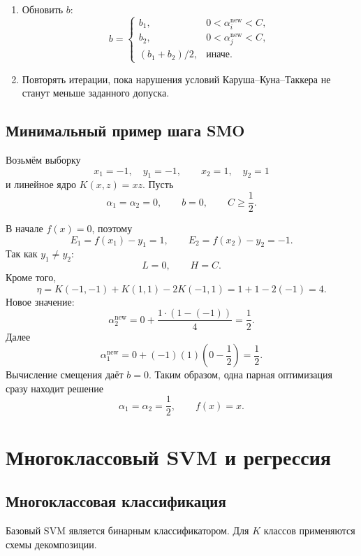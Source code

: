 \documentclass[12pt,a4paper]{article}
\theoremstyle{definition}
\newcommand{\1}{\mathbf{1}}
\begin{document}
\begin{enumerate}[label=\arabic*.]
    \item Обновить $b$:
    \[
        b=
        \begin{cases}
            b_1,
            &0<\alpha_i^{\mathrm{new}}<C,\\
            b_2,
            &0<\alpha_j^{\mathrm{new}}<C,\\
            (b_1+b_2)/2,
            &\text{иначе}.
        \end{cases}
    \]

    \item Повторять итерации, пока нарушения условий
    Каруша--Куна--Таккера не станут меньше заданного допуска.
\end{enumerate}

\subsection{Минимальный пример шага SMO}

Возьмём выборку
\[
    x_1=-1,\quad y_1=-1,
    \qquad
    x_2=1,\quad y_2=1
\]
и линейное ядро $K(x,z)=xz$. Пусть
\[
    \alpha_1=\alpha_2=0,
    \qquad
    b=0,
    \qquad
    C\geq\frac{1}{2}.
\]

В начале $f(x)=0$, поэтому
\[
    E_1=f(x_1)-y_1=1,
    \qquad
    E_2=f(x_2)-y_2=-1.
\]
Так как $y_1\neq y_2$:
\[
    L=0,
    \qquad
    H=C.
\]
Кроме того,
\[
    \eta
    =
    K(-1,-1)+K(1,1)-2K(-1,1)
    =
    1+1-2(-1)=4.
\]
Новое значение:
\[
    \alpha_2^{\mathrm{new}}
    =
    0+\frac{1\cdot(1-(-1))}{4}
    =
    \frac{1}{2}.
\]
Далее
\[
    \alpha_1^{\mathrm{new}}
    =
    0+(-1)(1)\left(0-\frac{1}{2}\right)
    =
    \frac{1}{2}.
\]
Вычисление смещения даёт $b=0$. Таким образом, одна парная
оптимизация сразу находит решение
\[
    \alpha_1=\alpha_2=\frac{1}{2},
    \qquad
    f(x)=x.
\]

\section{Многоклассовый SVM и регрессия}

\subsection{Многоклассовая классификация}

Базовый SVM является бинарным классификатором. Для $K$ классов
применяются схемы декомпозиции.
\end{document}
